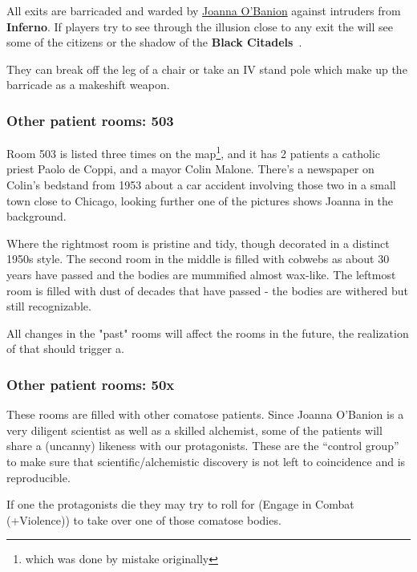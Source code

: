 All exits are barricaded and warded by \hyperref[ssub:joanna_o_banion]{Joanna O'Banion} against intruders from \textbf{Inferno}.
If players try to see through the illusion close to any exit the will see some of the citizens or the shadow of the
\textbf{Black Citadels}~\cite[p.316]{KULT:core}.

They can break off the leg of a chair or take an IV stand pole which make up the barricade as a makeshift weapon.

\subsubsection{Other patient rooms: 503}%
\label{ssub:other_patient_rooms_503}

Room 503 is listed three times on the map\footnote{which was done by mistake originally}, and it has 2 patients a catholic priest
Paolo de Coppi, and a mayor Colin Malone. There's a newspaper on Colin's bedstand from 1953 about a car accident involving those
two in a small town close to Chicago, looking further one of the pictures shows Joanna in the background.

Where the rightmost room is pristine and tidy, though decorated in a distinct 1950s style. The second room in the middle is filled
with cobwebs as about 30 years have passed and the bodies are mummified almost wax-like. The leftmost room is filled with dust of
decades that have passed - the bodies are withered but still recognizable.

All changes in the "past" rooms will affect the rooms in the future, the realization of that should trigger a.

\subsubsection{Other patient rooms: 50x}%
\label{ssub:other_patient_rooms}
These rooms are filled with other comatose patients.  Since Joanna O'Banion is a very diligent scientist as well as a skilled
alchemist, some of the patients will share a (uncanny) likeness with our protagonists.  These are the “control group” to make
sure that scientific/alchemistic discovery is not left to coincidence and is reproducible.

If one the protagonists die they may try to roll for \bluebf(Engage in Combat (+Violence)) to take over one of those comatose
bodies.

